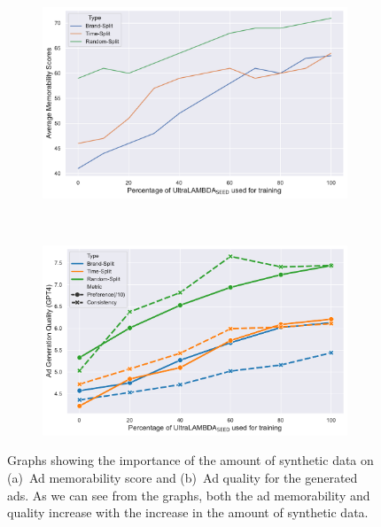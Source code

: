 \begin{figure}[t]
    \centering
    \begin{subfigure}{0.75\textwidth}
        \centering
        \includegraphics[width=\textwidth]{images/henry/memorability.pdf}
        \label{subfig:mem vs synthetic data}
        \caption{}
    \end{subfigure}
    \\
    \begin{subfigure}{0.75\textwidth}
        \centering
        \includegraphics[width=\textwidth]{images/henry/adquality.pdf}
        \label{subfig:ad-quality vs synthetic data}
        \caption{}
    \end{subfigure}
    \caption{Graphs showing the importance of the amount of synthetic data on (a)~Ad memorability score and (b)~Ad quality for the generated ads. As we can see from the graphs, both the ad memorability and quality increase with the increase in the amount of synthetic data. \label{fig:synthetic-data-vs-generation-performance-1}}
\end{figure}



